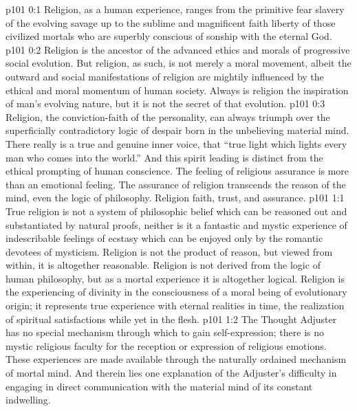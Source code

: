 \author{Melchizedek}
\vs p101 0:1 Religion, as a human experience, ranges from the primitive fear slavery of the evolving savage up to the sublime and magnificent faith liberty of those civilized mortals who are superbly conscious of sonship with the eternal God.
\vs p101 0:2 Religion is the ancestor of the advanced ethics and morals of progressive social evolution. But religion, as such, is not merely a moral movement, albeit the outward and social manifestations of religion are mightily influenced by the ethical and moral momentum of human society. Always is religion the inspiration of man’s evolving nature, but it is not the secret of that evolution.
\vs p101 0:3 Religion, the conviction\hyp{}faith of the personality, can always triumph over the superficially contradictory logic of despair born in the unbelieving material mind. There really is a true and genuine inner voice, that “true light which lights every man who comes into the world.” And this spirit leading is distinct from the ethical prompting of human conscience. The feeling of religious assurance is more than an emotional feeling. The assurance of religion transcends the reason of the mind, even the logic of philosophy. Religion  faith, trust, and assurance.
\vs p101 1:1 True religion is not a system of philosophic belief which can be reasoned out and substantiated by natural proofs, neither is it a fantastic and mystic experience of indescribable feelings of ecstasy which can be enjoyed only by the romantic devotees of mysticism. Religion is not the product of reason, but viewed from within, it is altogether reasonable. Religion is not derived from the logic of human philosophy, but as a mortal experience it is altogether logical. Religion is the experiencing of divinity in the consciousness of a moral being of evolutionary origin; it represents true experience with eternal realities in time, the realization of spiritual satisfactions while yet in the flesh.
\vs p101 1:2 \pc The Thought Adjuster has no special mechanism through which to gain self\hyp{}expression; there is no mystic religious faculty for the reception or expression of religious emotions. These experiences are made available through the naturally ordained mechanism of mortal mind. And therein lies one explanation of the Adjuster’s difficulty in engaging in direct communication with the material mind of its constant indwelling.
